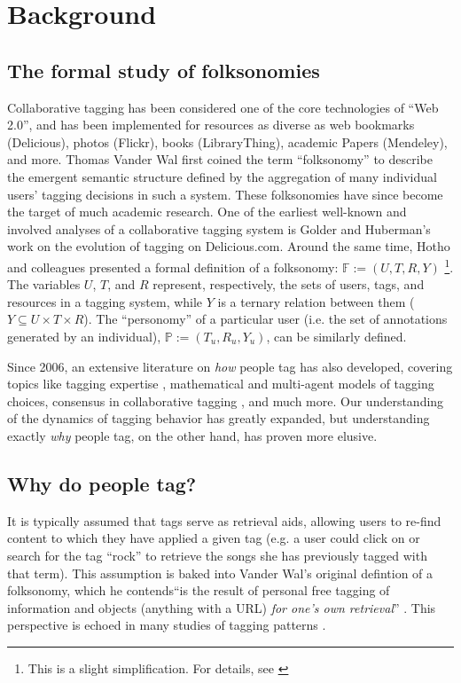 \section{Background}
\label{sec_related}

\subsection{The formal study of folksonomies}
Collaborative tagging has been considered one of the core technologies of ``Web 2.0'', and has been implemented for resources as diverse as web bookmarks (Delicious), photos (Flickr), books (LibraryThing), academic Papers (Mendeley), and more. Thomas Vander Wal \cite{VanderWal2007} first coined the term ``folksonomy'' to describe the emergent semantic structure defined by the aggregation of many individual users' tagging decisions in such a system. These folksonomies have since become the target of much academic research. One of the earliest well-known and involved analyses of a collaborative tagging system is Golder and Huberman's \cite{Golder2006} work on the evolution of tagging on Delicious.com.  Around the same time, Hotho and colleagues \cite{Hotho2006a} presented a formal definition of a folksonomy: $\mathbb{F} := (U,T,R,Y)$ \footnote{This is a slight simplification. For details, see \cite{Hotho2006a}}. The variables $U$, $T$, and $R$ represent, respectively, the sets of users, tags, and resources in a tagging system, while $Y$ is a ternary relation between them ($Y \subseteq U \times T \times R$). The ``personomy'' of a particular user (i.e. the set of annotations generated by an individual),  $\mathbb{P} := (T_{u},R_{u},Y_{u})$, can be similarly defined.

Since 2006, an extensive literature on \emph{how} people tag has also developed, covering topics like tagging expertise \cite{Yeung2011},	mathematical \cite{Cattuto2007a} and multi-agent \cite{Lorince2013} models of tagging choices, consensus in collaborative tagging \cite{Halpin2007,Robu2009}, and much more. Our understanding of the dynamics of tagging behavior has greatly expanded, but understanding exactly \emph{why} people tag, on the other hand, has proven more elusive.

\subsection{Why do people tag?}
It is typically assumed that tags serve as retrieval aids, allowing users to re-find content to which they have applied a given tag (e.g. a user could click on or search for the tag ``rock'' to retrieve the songs she has previously tagged with that term). This assumption is baked into Vander Wal's original defintion of a folksonomy, which he contends``is the result of personal free tagging of information and objects (anything with a URL) \emph{for one's own retrieval}'' \cite[emphasis added]{VanderWal2007}. This perspective is echoed in many studies of tagging patterns \cite{Glushko2008,Halpin2007,Golder2006}.

